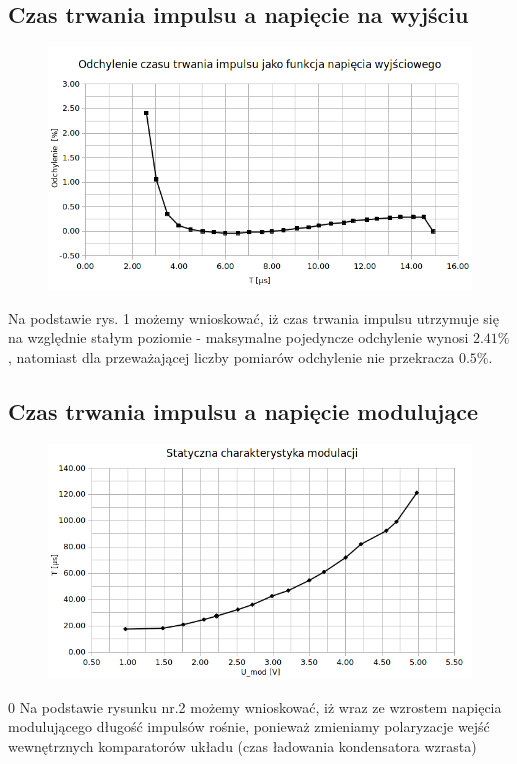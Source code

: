 \documentclass[a4paper,12pt]{article}
\begin{document}
\subsection{Czas trwania impulsu a napięcie na wyjściu}
\begin{figure}[h]
  \center 
  \includegraphics[width=1.1\textwidth]{charak1}
  \caption{}
\end{figure}
Na podstawie rys. 1 możemy wnioskować, iż czas trwania impulsu utrzymuje się na względnie stałym poziomie - maksymalne pojedyncze odchylenie wynosi
$2.41\%$, natomiast dla przeważającej liczby pomiarów odchylenie nie przekracza $0.5\%$.
\pagebreak
\subsection{Czas trwania impulsu a napięcie modulujące}
\begin{figure}[h]
  \centering
  \includegraphics[width=1.1\textwidth]{charak2}
  \caption{}
\end{figure}0
Na podstawie rysunku nr.2 możemy wnioskować, iż wraz ze wzrostem napięcia modulującego długość impulsów rośnie, ponieważ zmieniamy polaryzacje wejść wewnętrznych komparatorów układu (czas ładowania kondensatora wzrasta)
\end{document}
